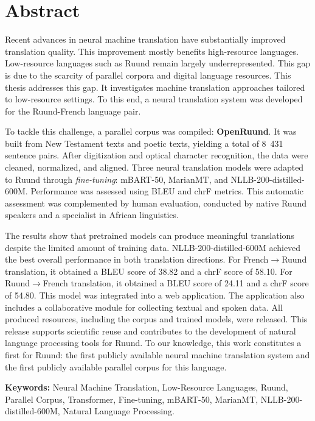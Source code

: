 \chapter*{Abstract}
Recent advances in neural machine translation have substantially improved translation quality. This improvement mostly benefits high-resource languages. Low-resource languages such as Ruund remain largely underrepresented. This gap is due to the scarcity of parallel corpora and digital language resources. This thesis addresses this gap. It investigates machine translation approaches tailored to low-resource settings. To this end, a neural translation system was developed for the Ruund-French language pair.

To tackle this challenge, a parallel corpus was compiled: \textbf{OpenRuund}. It was built from New Testament texts and poetic texts, yielding a total of 8~431 sentence pairs. After digitization and optical character recognition, the data were cleaned, normalized, and aligned. Three neural translation models were adapted to Ruund through \textit{fine-tuning}: mBART-50, MarianMT, and NLLB-200-distilled-600M. Performance was assessed using BLEU and chrF metrics. This automatic assessment was complemented by human evaluation, conducted by native Ruund speakers and a specialist in African linguistics.

The results show that pretrained models can produce meaningful translations despite the limited amount of training data. NLLB-200-distilled-600M achieved the best overall performance in both translation directions. For French$\rightarrow$Ruund translation, it obtained a BLEU score of 38.82 and a chrF score of 58.10. For Ruund$\rightarrow$French translation, it obtained a BLEU score of 24.11 and a chrF score of 54.80. This model was integrated into a web application. The application also includes a collaborative module for collecting textual and spoken data. All produced resources, including the corpus and trained models, were released. This release supports scientific reuse and contributes to the development of natural language processing tools for Ruund. To our knowledge, this work constitutes a first for Ruund: the first publicly available neural machine translation system and the first publicly available parallel corpus for this language.

\vspace{7cm}
\textbf{Keywords:} Neural Machine Translation, Low-Resource Languages, Ruund, Parallel Corpus, Transformer, Fine-tuning, mBART-50, MarianMT, NLLB-200-distilled-600M, Natural Language Processing.
